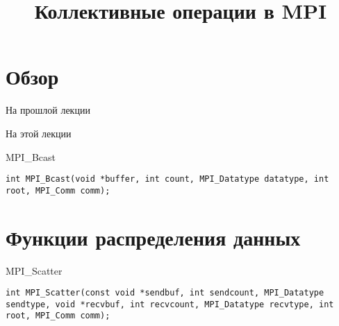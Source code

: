

\title{Коллективные операции в MPI}



\begin{frame}
\titlepage
\end{frame}

\section*{Обзор}

\begin{frame}{На прошлой лекции}
\end{frame}

\begin{frame}{На этой лекции}
\tableofcontents
\end{frame} 


\begin{frame}[fragile]{MPI_Bcast}

\begin{lstlisting}
int MPI_Bcast(void *buffer, int count, MPI_Datatype datatype, int root, MPI_Comm comm);
\end{lstlisting}

\end{frame}

\section{Функции распределения данных}

\begin{frame}[fragile]{MPI_Scatter}

\begin{lstlisting}
int MPI_Scatter(const void *sendbuf, int sendcount, MPI_Datatype sendtype, void *recvbuf, int recvcount, MPI_Datatype recvtype, int root, MPI_Comm comm);
\end{lstlisting}

\end{frame}

